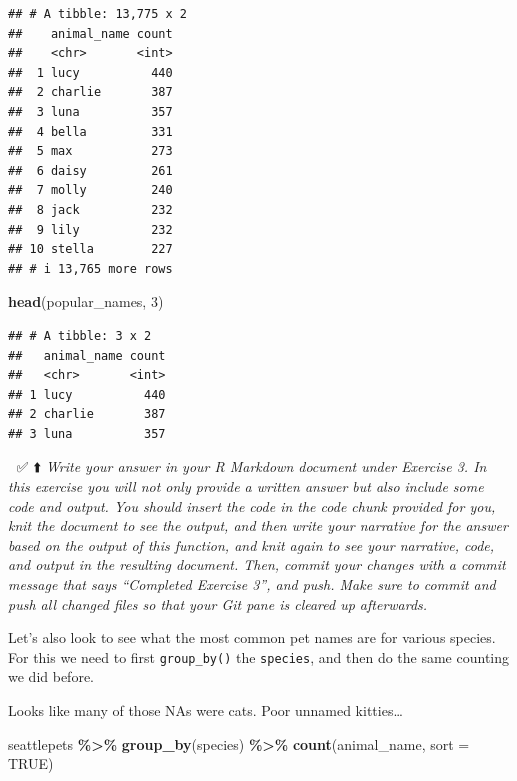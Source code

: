 \documentclass[
]{article}
\newenvironment{Shaded}{\begin{snugshade}}{\end{snugshade}}
\newcommand{\AttributeTok}[1]{\textcolor[rgb]{0.13,0.29,0.53}{#1}}
\newcommand{\ConstantTok}[1]{\textcolor[rgb]{0.56,0.35,0.01}{#1}}
\newcommand{\DecValTok}[1]{\textcolor[rgb]{0.00,0.00,0.81}{#1}}
\newcommand{\FunctionTok}[1]{\textcolor[rgb]{0.13,0.29,0.53}{\textbf{#1}}}
\newcommand{\NormalTok}[1]{#1}
\newcommand{\SpecialCharTok}[1]{\textcolor[rgb]{0.81,0.36,0.00}{\textbf{#1}}}
\begin{document}
\begin{verbatim}
## # A tibble: 13,775 x 2
##    animal_name count
##    <chr>       <int>
##  1 lucy          440
##  2 charlie       387
##  3 luna          357
##  4 bella         331
##  5 max           273
##  6 daisy         261
##  7 molly         240
##  8 jack          232
##  9 lily          232
## 10 stella        227
## # i 13,765 more rows
\end{verbatim}

\begin{Shaded}
\begin{Highlighting}[]
\FunctionTok{head}\NormalTok{(popular\_names, }\DecValTok{3}\NormalTok{)}
\end{Highlighting}
\end{Shaded}

\begin{verbatim}
## # A tibble: 3 x 2
##   animal_name count
##   <chr>       <int>
## 1 lucy          440
## 2 charlie       387
## 3 luna          357
\end{verbatim}

🧶 ✅ ⬆️ \emph{Write your answer in your R Markdown document under
Exercise 3. In this exercise you will not only provide a written answer
but also include some code and output. You should insert the code in the
code chunk provided for you, knit the document to see the output, and
then write your narrative for the answer based on the output of this
function, and knit again to see your narrative, code, and output in the
resulting document. Then, commit your changes with a commit message that
says ``Completed Exercise 3'', and push. Make sure to commit and push
all changed files so that your Git pane is cleared up afterwards.}

Let's also look to see what the most common pet names are for various
species. For this we need to first \texttt{group\_by()} the
\texttt{species}, and then do the same counting we did before.

\begin{Shaded}
\begin{Highlighting}[]
\NormalTok{Looks like many of those NAs were cats. Poor unnamed kitties…}
\end{Highlighting}
\end{Shaded}

\begin{Shaded}
\begin{Highlighting}[]
\NormalTok{seattlepets }\SpecialCharTok{\%\textgreater{}\%}
  \FunctionTok{group\_by}\NormalTok{(species) }\SpecialCharTok{\%\textgreater{}\%}
  \FunctionTok{count}\NormalTok{(animal\_name, }\AttributeTok{sort =} \ConstantTok{TRUE}\NormalTok{)}
\end{Highlighting}
\end{Shaded}
\end{document}
